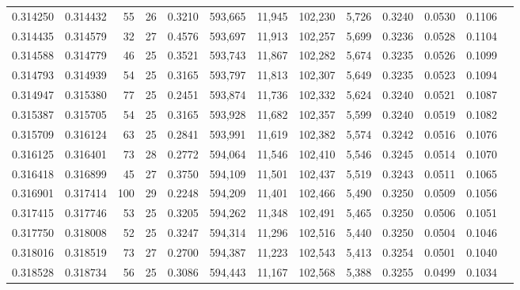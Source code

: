 \begin{tabular}{rrrrrrrrrrrrr}
0.314250 & 0.314432 &  55 &  26 &                                     0.3210 & 593,665 &  11,945 & 102,230 &   5,726 & 0.3240 & 0.0530 & 0.1106 \\
0.314435 & 0.314579 &  32 &  27 &                                     0.4576 & 593,697 &  11,913 & 102,257 &   5,699 & 0.3236 & 0.0528 & 0.1104 \\
0.314588 & 0.314779 &  46 &  25 &                                     0.3521 & 593,743 &  11,867 & 102,282 &   5,674 & 0.3235 & 0.0526 & 0.1099 \\
0.314793 & 0.314939 &  54 &  25 &                                     0.3165 & 593,797 &  11,813 & 102,307 &   5,649 & 0.3235 & 0.0523 & 0.1094 \\
0.314947 & 0.315380 &  77 &  25 &                                     0.2451 & 593,874 &  11,736 & 102,332 &   5,624 & 0.3240 & 0.0521 & 0.1087 \\
0.315387 & 0.315705 &  54 &  25 &                                     0.3165 & 593,928 &  11,682 & 102,357 &   5,599 & 0.3240 & 0.0519 & 0.1082 \\
0.315709 & 0.316124 &  63 &  25 &                                     0.2841 & 593,991 &  11,619 & 102,382 &   5,574 & 0.3242 & 0.0516 & 0.1076 \\
0.316125 & 0.316401 &  73 &  28 &                                     0.2772 & 594,064 &  11,546 & 102,410 &   5,546 & 0.3245 & 0.0514 & 0.1070 \\
0.316418 & 0.316899 &  45 &  27 &                                     0.3750 & 594,109 &  11,501 & 102,437 &   5,519 & 0.3243 & 0.0511 & 0.1065 \\
0.316901 & 0.317414 & 100 &  29 &                                     0.2248 & 594,209 &  11,401 & 102,466 &   5,490 & 0.3250 & 0.0509 & 0.1056 \\
0.317415 & 0.317746 &  53 &  25 &                                     0.3205 & 594,262 &  11,348 & 102,491 &   5,465 & 0.3250 & 0.0506 & 0.1051 \\
0.317750 & 0.318008 &  52 &  25 &                                     0.3247 & 594,314 &  11,296 & 102,516 &   5,440 & 0.3250 & 0.0504 & 0.1046 \\
0.318016 & 0.318519 &  73 &  27 &                                     0.2700 & 594,387 &  11,223 & 102,543 &   5,413 & 0.3254 & 0.0501 & 0.1040 \\
0.318528 & 0.318734 &  56 &  25 &                                     0.3086 & 594,443 &  11,167 & 102,568 &   5,388 & 0.3255 & 0.0499 & 0.1034 \\

\end{tabular}
